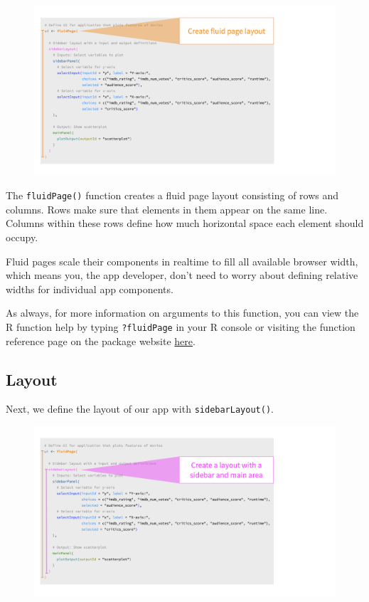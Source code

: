 \documentclass[
  letterpaper,
  DIV=11,
  numbers=noendperiod]{scrreprt}
\begin{document}
\begin{figure}

{\centering \includegraphics[width=1\textwidth,height=\textheight]{./images/fluidPage.png}

}

\end{figure}

The \texttt{fluidPage()} function creates a fluid page layout consisting
of rows and columns. Rows make sure that elements in them appear on the
same line. Columns within these rows define how much horizontal space
each element should occupy.

Fluid pages scale their components in realtime to fill all available
browser width, which means you, the app developer, don't need to worry
about defining relative widths for individual app components.

As always, for more information on arguments to this function, you can
view the R function help by typing \texttt{?fluidPage} in your R console
or visiting the function reference page on the package website
\href{https://shiny.rstudio.com/reference/shiny/latest/}{here}.

\hypertarget{layout-1}{%
\subsection{Layout}\label{layout-1}}

Next, we define the layout of our app with \texttt{sidebarLayout()}.

\begin{figure}

{\centering \includegraphics[width=1\textwidth,height=\textheight]{./images/layout.png}

}

\end{figure}
\end{document}

